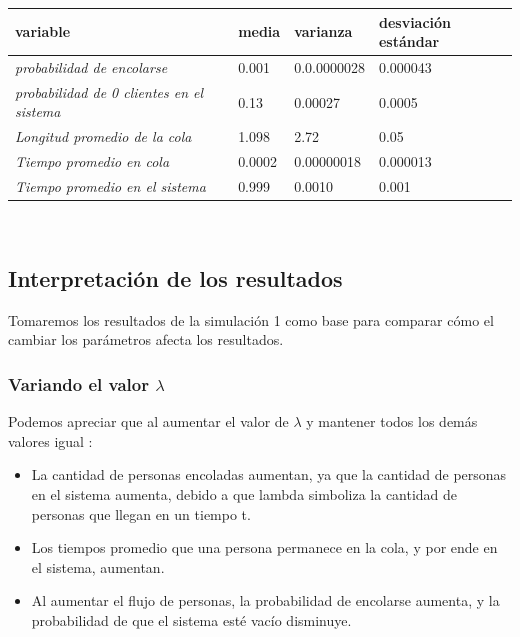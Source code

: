 \documentclass[11pt]{article}
\begin{document}
    \begin{table}[h]
\begin{tabular}{|l|l|l|l|}
\hline
\textbf{variable}                                 & \textbf{media} & \textbf{varianza} & \textbf{desviación estándar} \\ \hline
\textit{probabilidad de encolarse}                & 0.001          & 0.0.0000028             & 0.000043                    \\ \hline
\textit{probabilidad de 0 clientes en el sistema} & 0.13          & 0.00027            & 0.0005                        \\ \hline
\textit{Longitud promedio de la cola}             & 1.098            & 2.72              & 0.05                         \\ \hline
\textit{Tiempo promedio en cola}                  & 0.0002          & 0.00000018            & 0.000013                     \\ \hline
\textit{Tiempo promedio en el sistema}            & 0.999           & 0.0010             & 0.001                     \\ \hline
\end{tabular}
\end{table}\\



    \subsection{Interpretación de los resultados}

    Tomaremos los resultados de la simulación 1 como base para comparar cómo el cambiar los parámetros afecta los resultados.

    \subsubsection{Variando el valor $\lambda$}
    Podemos apreciar que al aumentar el valor de $\lambda$ y mantener todos los demás valores igual :
    \begin{itemize}
        \item La cantidad de personas encoladas aumentan, ya que la cantidad de personas en el sistema aumenta, debido a que lambda simboliza la cantidad de personas que llegan en un tiempo t.
        \item Los tiempos promedio que una persona permanece en la cola, y por ende en el sistema, aumentan.
        \item Al aumentar el flujo de personas, la probabilidad de encolarse aumenta, y la probabilidad de que el sistema esté vacío disminuye.
    \end{itemize}
\end{document}
